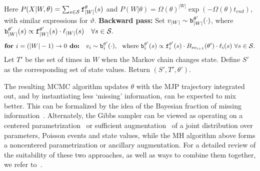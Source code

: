 \begin{algorithm}[H]
\begin{algorithmic}[1]
\begin{align}
          \end{align}
          Here $P(X|W,\theta) = \sum_{s \in {\mathcal S}} \mathtt{f}_{|W|}^\theta(s) $ and $P(W|\theta) = \Omega(\theta)^{|W|}\exp(-\Omega(\theta)t_{end})$, with similar expressions for $\vartheta$. 
    \State %
    \textbf{Backward pass:}
    Set $v_{|W|} \sim \mathtt{b}^{\theta'}_{|W|}(\cdot)$, where $\mathtt{b}^{\theta'}_{|W|}(s) \propto \mathtt{f}^{\theta'}_{|W|}(s)\cdot\ell_{|W|}(s) \quad \forall s \in {\mathcal S}.$ 
    $$ \textbf{for } i=(|W|-1)\rightarrow 0\textbf{ do:} \quad v_i \sim \mathtt{b}^{\theta'}_i(\cdot),\ \ \text{where } 
    \mathtt{b}^{\theta'}_i(s) \propto \mathtt{f}^{\theta'}_i(s)\cdot B_{sv_{i+1}}(\theta') \cdot \ell_i(s)  \ \forall s \in {\mathcal S}.$$
    \State Let $T'$ be the set of times in $W$ when the Markov chain changes state. Define $S'$ as the corresponding set of state values. Return $(S', T', \theta')$.
\end{algorithmic}
\end{algorithm}
The resulting MCMC algorithm updates $\theta$ with the MJP trajectory 
integrated out, and by instantiating less `missing' information, can be expected to mix better. 
This can be formalized by the idea of the Bayesian fraction of missing information~\citep{liu1994fraction, papaspiliopoulos2007general}. 
Alternately, the Gibbs sampler can be viewed as operating on a centered parametrization~\citep{papaspiliopoulos2007general} or sufficient augmentation~\citep{yu2011center} of a joint distribution over parameters, Poisson events and state values, while the MH algorithm above forms a noncentered parametrization or ancillary augmentation.
For a detailed review of the suitability of these two approaches, as well as ways to combine them together, we refer to~\citet{papaspiliopoulos2007general, yu2011center}.

